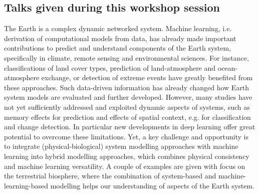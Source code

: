 \subsection{Talks given during this workshop session}

\license

The Earth is a complex dynamic networked system. Machine learning, i.e. derivation of computational models from data, has already made important contributions to predict and understand components of the Earth system, specifically in climate, remote sensing and environmental sciences. For instance, classifications of land cover types, prediction of land-atmosphere and ocean-atmosphere exchange, or detection of extreme events have greatly benefited from these approaches. Such data-driven information has already changed how Earth system models are evaluated and further developed. However, many studies have not yet sufficiently addressed and exploited dynamic aspects of systems, such as memory effects for prediction and effects of spatial context, e.g. for classification and change detection. In particular new developments in deep learning offer great potential to overcome these limitations. Yet, a key challenge and opportunity is to integrate (physical-biological) system modelling approaches with machine learning into hybrid modelling approaches, which combines physical consistency and machine learning versatility. A couple of examples are given with focus on the terrestrial biosphere, where the combination of system-based and machine-learning-based modelling helps our understanding of aspects of the Earth system.

\license

